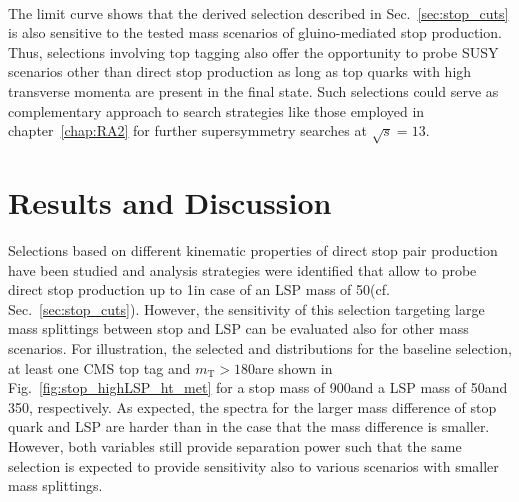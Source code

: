 \\
The limit curve shows that the derived selection described in Sec.~\ref{sec:stop_cuts} is also sensitive to the tested mass scenarios of gluino-mediated stop production. Thus, selections involving top tagging also offer the opportunity to probe SUSY scenarios other than direct stop production as long as top quarks with high transverse momenta are present in the final state. Such selections could serve as complementary approach to search strategies like those employed in chapter~\ref{chap:RA2} for further supersymmetry searches at $\sqrt{s} = 13$\tev. 

\section{Results and Discussion}
\label{sec:stop_results}
Selections based on different kinematic properties of direct stop pair production have been studied and analysis strategies were identified that allow to probe direct stop production up to 1\tev in case of an LSP mass of 50\gev (cf. Sec.~\ref{sec:stop_cuts}). However, the sensitivity of this selection targeting large mass splittings between stop and LSP can be evaluated also for other mass scenarios. For illustration, the selected \HT and \met distributions for the baseline selection, at least one CMS top tag and $m_\mathrm{T} > 180$\gev are shown in Fig.~\ref{fig:stop_highLSP_ht_met} for a stop mass of 900\gev and a LSP mass of 50\gev and 350\gev, respectively. As expected, the spectra for the larger mass difference of stop quark and LSP are harder than in the case that the mass difference is smaller. However, both variables still provide separation power such that the same selection is expected to provide sensitivity also to various scenarios with smaller mass splittings. 

